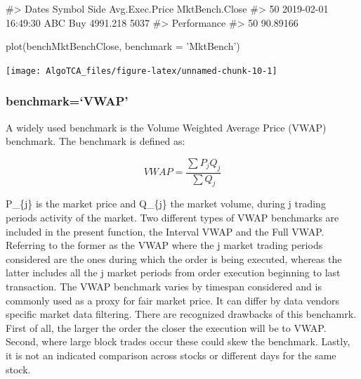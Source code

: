 \begin{Schunk}
\begin{Soutput}
#>                  Dates Symbol Side Avg.Exec.Price MktBench.Close
#> 50 2019-02-01 16:49:30    ABC  Buy       4991.218           5037
#>    Performance
#> 50    90.89166
\end{Soutput}
\begin{Sinput}
plot(benchMktBenchClose, benchmark = 'MktBench')
\end{Sinput}

\texttt{[image: AlgoTCA\_files/figure-latex/unnamed-chunk-10-1]} \end{Schunk}

\hypertarget{benchmarkvwap}{%
\subsubsection{benchmark=`VWAP'}\label{benchmarkvwap}}

A widely used benchmark is the Volume Weighted Average Price (VWAP)
benchmark. The benchmark is defined as:

\[ VWAP = \frac{\sum {P_{j}Q_{j}}}{\sum {Q_{j}}} \]

P\_\{j\} is the market price and Q\_\{j\} the market volume, during j
trading periods activity of the market. Two different types of VWAP
benchmarks are included in the present function, the Interval VWAP and
the Full VWAP. Referring to the former as the VWAP where the j market
trading periods considered are the ones during which the order is being
executed, whereas the latter includes all the j market periods from
order execution beginning to last transaction. The VWAP benchmark varies
by timespan considered and is commonly used as a proxy for fair market
price. It can differ by data vendors specific market data filtering.
There are recognized drawbacks of this benchamrk. First of all, the
larger the order the closer the execution will be to VWAP. Second, where
large block trades occur these could skew the benchmark. Lastly, it is
not an indicated comparison across stocks or different days for the same
stock.

